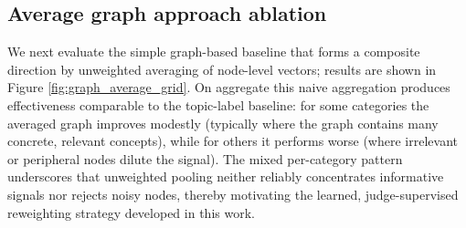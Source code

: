 \documentclass{article}
\theoremstyle{plain}
\theoremstyle{definition}
\theoremstyle{remark}
\begin{document}
\newpage
\subsection{Average graph approach ablation} \label{subsec:graph_average_ablation}
We next evaluate the simple graph-based baseline that forms a composite direction by unweighted averaging of node-level vectors; results are shown in Figure \ref{fig:graph_average_grid}. On aggregate this naive aggregation produces effectiveness comparable to the topic-label baseline: for some categories the averaged graph improves modestly (typically where the graph contains many concrete, relevant concepts), while for others it performs worse (where irrelevant or peripheral nodes dilute the signal). The mixed per-category pattern underscores that unweighted pooling neither reliably concentrates informative signals nor rejects noisy nodes, thereby motivating the learned, judge-supervised reweighting strategy developed in this work.
\end{document}
